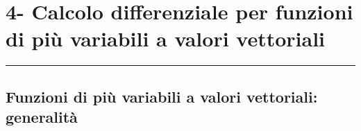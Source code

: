 \section*{4- Calcolo differenziale per funzioni di più variabili a valori vettoriali}
\rule{\textwidth}{2pt}
\subsection*{Funzioni di più variabili a valori vettoriali: generalità}